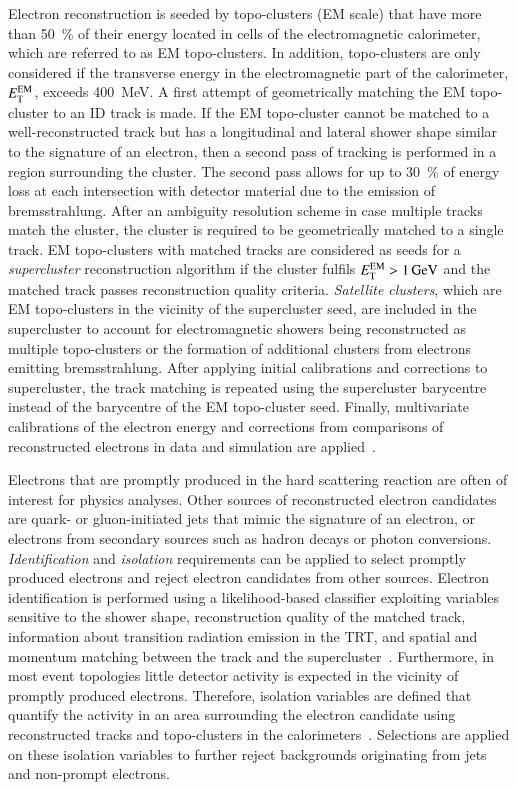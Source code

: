 Electron reconstruction is seeded by topo-clusters (EM scale) that have more
than \SI{50}{\percent} of their energy located in cells of the electromagnetic
calorimeter, which are referred to as EM topo-clusters. In addition,
topo-clusters are only considered if the transverse energy in the
electromagnetic part of the calorimeter, $E_{\text{T}}^{\text{EM}}$, exceeds
\SI{400}{\MeV}. A first attempt of geometrically matching the EM topo-cluster to
an ID track is made. If the EM topo-cluster cannot be matched to a
well-reconstructed track but has a longitudinal and lateral shower shape similar
to the signature of an electron, then a second pass of tracking is performed in
a region surrounding the cluster. The second pass allows for up to
\SI{30}{\percent} of energy loss at each intersection with detector material due
to the emission of bremsstrahlung. After an ambiguity resolution scheme in case
multiple tracks match the cluster, the cluster is required to be geometrically
matched to a single track. EM topo-clusters with matched tracks are considered
as seeds for a \emph{supercluster} reconstruction algorithm if the cluster
fulfils $E_{\text{T}}^{\text{EM}} > \SI{1}{\ensuremath{\text{GeV}}}$ and the matched track passes
reconstruction quality criteria. \emph{Satellite clusters}, which are EM
topo-clusters in the vicinity of the supercluster seed, are included in the
supercluster to account for electromagnetic showers being reconstructed as
multiple topo-clusters or the formation of additional clusters from electrons
emitting bremsstrahlung. After applying initial calibrations and corrections to
supercluster, the track matching is repeated using the supercluster barycentre
instead of the barycentre of the EM topo-cluster seed. Finally, multivariate
calibrations of the electron energy and corrections from comparisons of
reconstructed electrons in data and simulation are
applied~\cite{PERF-2017-03,EGAM-2018-01}.

Electrons that are promptly produced in the hard scattering reaction are often
of interest for physics analyses. Other sources of reconstructed electron
candidates are quark- or gluon-initiated jets that mimic the signature of an
electron, or electrons from secondary sources such as hadron decays or photon
conversions. \emph{Identification} and \emph{isolation} requirements can be
applied to select promptly produced electrons and reject electron candidates
from other sources. Electron identification is performed using a
likelihood-based classifier exploiting variables sensitive to the shower shape,
reconstruction quality of the matched track, information about transition
radiation emission in the TRT, and spatial and momentum matching between the
track and the supercluster~\cite{EGAM-2018-01}. Furthermore, in most event
topologies little detector activity is expected in the vicinity of promptly
produced electrons. Therefore, isolation variables are defined that quantify the
activity in an area surrounding the electron candidate using reconstructed
tracks and topo-clusters in the calorimeters~\cite{EGAM-2018-01}. Selections are
applied on these isolation variables to further reject backgrounds originating
from jets and non-prompt electrons.


